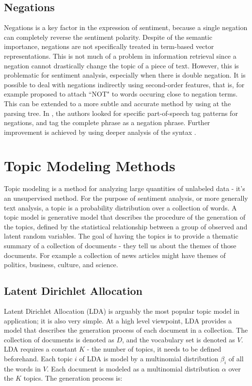 \subsection{Negations}

Negations is a key factor in the expression of sentiment, because a single negation can completely reverse the sentiment polarity. Despite of the semantic importance, negations are not specifically treated in term-based vector representations. This is not much of a problem in information retrieval since a negation cannot drastically change the topic of a piece of text. However, this is problematic for sentiment analysis, especially when there is double negation. It is possible to deal with negations indirectly using second-order features, that is, for example \cite{das2001yahoo} proposed to attach ``NOT" to words occuring close to negation terms. This can be extended to a more subtle and accurate method by using at the parsing tree. In \cite{na2004effectiveness}, the authors looked for specific part-of-speech tag patterns for negations, and tag the complete phrase as a negation phrase. Further improvement is achieved by using deeper analysis of the syntax \cite{kennedy2006sentiment}.

\section{Topic Modeling Methods}

Topic modeling is a method for analyzing large quantities of unlabeled data - it's an unsupervised method. For the purpose of sentiment analysis, or more generally text analysis, a topic is a probability distribution over a collection of words. A topic model is generative model that describes the procedure of the generation of the topics, defined by the statistical relationship between a group of observed and latent random variables. The goal of having the topics is to provide a thematic summary of a collection of documents - they tell us about the themes of those documents. For example a collection of news articles might have themes of politics, business, culture, and science.

\subsection{Latent Dirichlet Allocation}

Latent Dirichlet Allocation (LDA) \cite{blei2003latent} is arguably the most popular topic model in application; it is also very simple. At a high level viewpoint, LDA provides a model that describes the generation process of each document in a collection. The collection of documents is denoted as $D$, and the vocabulary set is denoted as $V$. LDA requires a constant $K$ - the number of topics, it needs to be defined beforehand.
Each topic $i$ of LDA is model by a multinomial distribution $\beta_i$ of all the  words in $V$. Each document is modeled as a multinomial distribution $\alpha$ over the $K$ topics. The generation process is:

